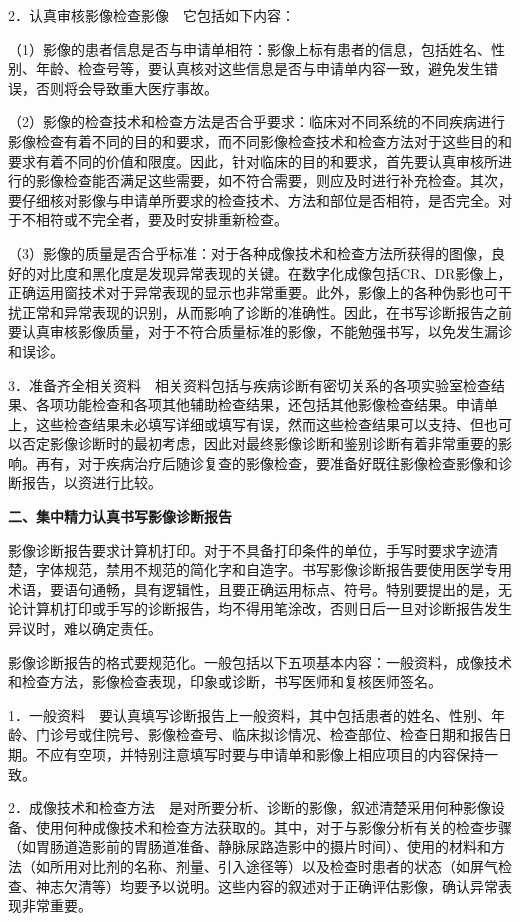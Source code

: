 2．认真审核影像检查影像　它包括如下内容：

（1）影像的患者信息是否与申请单相符：影像上标有患者的信息，包括姓名、性别、年龄、检查号等，要认真核对这些信息是否与申请单内容一致，避免发生错误，否则将会导致重大医疗事故。

（2）影像的检查技术和检查方法是否合乎要求：临床对不同系统的不同疾病进行影像检查有着不同的目的和要求，而不同影像检查技术和检查方法对于这些目的和要求有着不同的价值和限度。因此，针对临床的目的和要求，首先要认真审核所进行的影像检查能否满足这些需要，如不符合需要，则应及时进行补充检查。其次，要仔细核对影像与申请单所要求的检查技术、方法和部位是否相符，是否完全。对于不相符或不完全者，要及时安排重新检查。

（3）影像的质量是否合乎标准：对于各种成像技术和检查方法所获得的图像，良好的对比度和黑化度是发现异常表现的关键。在数字化成像包括CR、DR影像上，正确运用窗技术对于异常表现的显示也非常重要。此外，影像上的各种伪影也可干扰正常和异常表现的识别，从而影响了诊断的准确性。因此，在书写诊断报告之前要认真审核影像质量，对于不符合质量标准的影像，不能勉强书写，以免发生漏诊和误诊。

3．准备齐全相关资料　相关资料包括与疾病诊断有密切关系的各项实验室检查结果、各项功能检查和各项其他辅助检查结果，还包括其他影像检查结果。申请单上，这些检查结果未必填写详细或填写有误，然而这些检查结果可以支持、但也可以否定影像诊断时的最初考虑，因此对最终影像诊断和鉴别诊断有着非常重要的影响。再有，对于疾病治疗后随诊复查的影像检查，要准备好既往影像检查影像和诊断报告，以资进行比较。

\textbf{二、集中精力认真书写影像诊断报告}

影像诊断报告要求计算机打印。对于不具备打印条件的单位，手写时要求字迹清楚，字体规范，禁用不规范的简化字和自造字。书写影像诊断报告要使用医学专用术语，要语句通畅，具有逻辑性，且要正确运用标点、符号。特别要提出的是，无论计算机打印或手写的诊断报告，均不得用笔涂改，否则日后一旦对诊断报告发生异议时，难以确定责任。

影像诊断报告的格式要规范化。一般包括以下五项基本内容：一般资料，成像技术和检查方法，影像检查表现，印象或诊断，书写医师和复核医师签名。

1．一般资料　要认真填写诊断报告上一般资料，其中包括患者的姓名、性别、年龄、门诊号或住院号、影像检查号、临床拟诊情况、检查部位、检查日期和报告日期。不应有空项，并特别注意填写时要与申请单和影像上相应项目的内容保持一致。

2．成像技术和检查方法　是对所要分析、诊断的影像，叙述清楚采用何种影像设备、使用何种成像技术和检查方法获取的。其中，对于与影像分析有关的检查步骤（如胃肠道造影前的胃肠道准备、静脉尿路造影中的摄片时间）、使用的材料和方法（如所用对比剂的名称、剂量、引入途径等）以及检查时患者的状态（如屏气检查、神志欠清等）均要予以说明。这些内容的叙述对于正确评估影像，确认异常表现非常重要。

